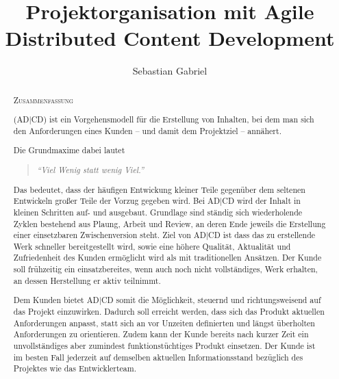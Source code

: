 \documentclass[fontsize=9pt,paper=a4,parskip=half,DIV=11,twocolumn]{scrartcl}
\title{Projektorganisation mit Agile Distributed Content Development}
\author{Sebastian Gabriel}
\begin{document}
\renewcommand{\ADCD}[1]{{\sffamily\color{Grey}\small{\color{DefaultA}AD}|{\color{DefaultB}CD}}}

\maketitle

\tableofcontents

\vspace{1em}

\begin{abstract}

\begin{center}
{\scshape\large Zusammenfassung}
\end{center}

 (\ADCD{}) ist ein Vorgehensmodell für
die Erstellung von Inhalten, bei dem man sich den Anforderungen eines Kunden -- und
damit dem Projektziel --  annähert.

Die Grundmaxime dabei lautet  

\begin{quote}
\emph{"`Viel Wenig statt wenig Viel."'}
\end{quote}

 Das
bedeutet, dass der häufigen Entwickung kleiner Teile gegenüber dem seltenen
Entwickeln großer Teile der Vorzug gegeben wird.  Bei \ADCD{}
wird der Inhalt in kleinen Schritten auf- und ausgebaut. Grundlage sind
ständig sich wiederholende Zyklen bestehend aus Plaung, Arbeit und Review, an
deren Ende jeweils die Erstellung einer einsetzbaren Zwischenversion steht. 
Ziel von  \ADCD{} ist dass das zu erstellende Werk
schneller bereitgestellt wird, sowie eine höhere Qualität, Aktualität und
Zufriedenheit des Kunden ermöglicht wird als mit traditionellen Ansätzen.  Der
Kunde soll frühzeitig ein einsatzbereites, wenn auch noch nicht vollständiges,
Werk erhalten, an dessen Herstellung er aktiv teilnimmt. 

Dem Kunden bietet \ADCD{} somit
die Möglichkeit, steuernd und richtungsweisend auf das Projekt einzuwirken.
Dadurch soll erreicht werden, dass sich das Produkt aktuellen Anforderungen
anpasst, statt sich an vor Unzeiten definierten und längst überholten
Anforderungen zu orientieren. Zudem kann der Kunde bereits nach kurzer
Zeit ein unvollständiges aber zumindest funktionstüchtiges Produkt einsetzen. Der
Kunde ist im besten Fall jederzeit auf demselben aktuellen Informationsstand
bezüglich des Projektes wie das Entwicklerteam.
\end{abstract}
\end{document}
